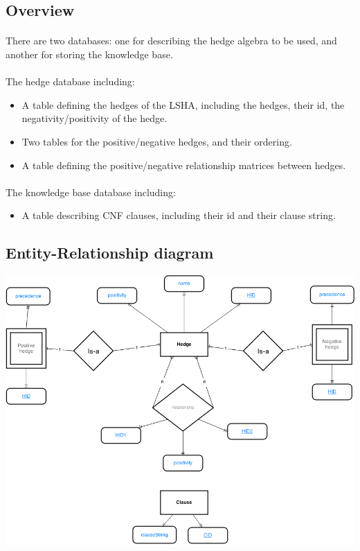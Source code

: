 \documentclass[26pt,fleqn,]{article}
\begin{document}
\subsection{Overview}

\paragraph{}There are two databases: one for describing the hedge algebra to be used, and another for storing the knowledge base.\\

\paragraph{}The hedge database including:

\begin{itemize}
\item A table defining the hedges of the LSHA, including the hedges, their id, the negativity/positivity of the hedge.
\item Two tables for the positive/negative hedges, and their ordering.
\item A table defining the positive/negative relationship matrices between hedges.
\end{itemize}

\paragraph{}The knowledge base database including:

\begin{itemize}
\item A table describing CNF clauses, including their id and their clause string. 
\end{itemize}

\subsection{Entity-Relationship diagram}
\includegraphics[scale=0.45]{ERDiagram}
\end{document}

